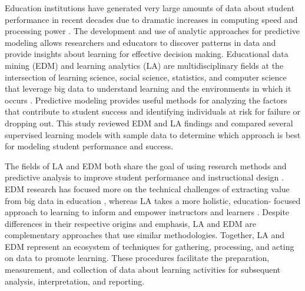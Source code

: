 \documentclass[sigconf]{acmart}
\begin{document}
Education institutions have generated very large amounts of data about student 
performance in recent decades due to dramatic increases in computing speed 
and processing power \cite{daniel15, daniel16}. The development and use of 
analytic approaches for predictive modeling allows researchers and educators  
to discover patterns in data and provide insights about learning for effective 
decision making. Educational data mining (EDM) and learning analytics (LA) are 
multidisciplinary fields at the intersection of learning science, social science, 
statistics, and computer science that leverage big data to understand learning 
and the environments in which it occurs \cite{siemens13, siemensbaker12}. 
Predictive modeling provides useful methods for analyzing the factors that 
contribute to student success and identifying individuals at risk for failure
or dropping out. This study reviewed EDM and LA findings and compared several 
supervised learning models with sample data to determine which approach is 
best for modeling student performance and success. 


The fields of LA and EDM both share the goal of using research methods and
predictive analysis to improve student performance and instructional design 
\cite{baker09, ferguson12, lester19}. EDM research has focused more on the 
technical challenges of extracting value from big data in education 
\cite{penaAyala14, romero10}, whereas LA takes a more holistic, education-
focused approach to learning to inform and empower instructors and learners 
\cite{lang17, papamitsiou14}. Despite differences in their respective origins 
and emphasis, LA and EDM are complementary approaches that use similar 
methodologies. Together, LA and EDM represent an ecosystem of techniques for 
gathering, processing, and acting on data to promote learning. These procedures 
facilitate the preparation, measurement, and collection of data about learning 
activities for subsequent analysis, interpretation, and reporting. 

\end{document}
